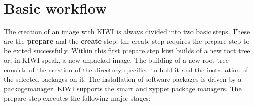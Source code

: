 \chapter{Basic workflow}
\label{chapter:workflow}
\minitoc

The creation of an image with KIWI is always divided into two
basic steps. These are the \textbf{prepare} and the \textbf{create}
step. the create step requires the prepare step to be exited
successfully. Within this first prepare step kiwi builds of a new root
tree or, in KIWI speak, a new unpacked image. The building of a new
root tree consists of the creation of the directory specified to
hold it and the installation of the selected packages on it. The
installation of software packages is driven by a packagemanager.
KIWI supports the smart and zypper package managers. The prepare
step executes the following major stages:

